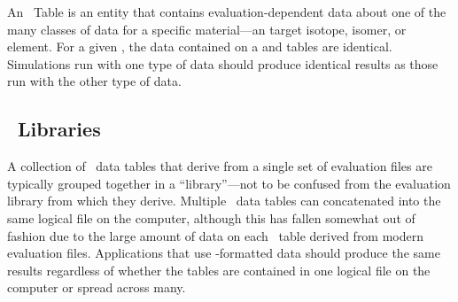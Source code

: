 An \ACE\ Table is an entity that contains evaluation-dependent data about one of the many classes of data for a specific material---an target isotope, isomer, or element. For a given \ZAID, the data contained on a  and  tables are identical. Simulations run with one type of data should produce identical results as those run with the other type of data. 

\subsection{\ACE\ Libraries}
A collection of \ACE\ data tables that derive from a single set of evaluation files are typically grouped together in a ``library''---not to be confused from the evaluation library from which they derive. Multiple \ACE\ data tables can concatenated into the same logical file on the computer, although this has fallen somewhat out of fashion due to the large amount of data on each \ACE\ table derived from modern evaluation files. Applications that use \ACE-formatted data should produce the same results regardless of whether the tables are contained in one logical file on the computer or spread across many.
